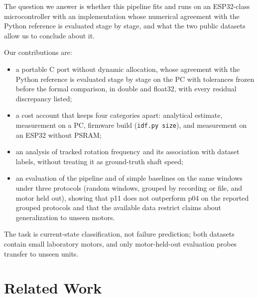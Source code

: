 \documentclass[conference]{IEEEtran}
\newif\ifwip
\begin{document}
The question we answer is whether this pipeline fits and runs on an ESP32-class
microcontroller with an implementation whose numerical agreement with the Python reference is
evaluated stage by stage, and what the two public datasets allow us to conclude about it.
\ifwip
We contribute a portable C implementation whose agreement with the Python reference is evaluated
stage by stage on the PC with tolerances frozen before formal comparison, a cost account that
keeps estimates, PC measurements, firmware builds and on-chip measurements apart, an analysis of
tracked acoustic frequency without treating it as ground-truth shaft speed, and an evaluation
under three protocols showing that p11 does not beat simple baselines and that the available data
restrict claims about generalization to unseen motors.
\else
Our contributions are:
\begin{itemize}
\item a portable C port without dynamic allocation, whose agreement with the Python reference is
evaluated stage by stage on the PC with tolerances frozen before the formal comparison, in double
and float32, with every residual discrepancy listed;
\item a cost account that keeps four categories apart: analytical estimate, measurement on a PC,
firmware build (\texttt{idf.py size}), and measurement on an ESP32 without PSRAM;
\item an analysis of tracked rotation frequency and its association with dataset labels, without
treating it as ground-truth shaft speed;
\item an evaluation of the pipeline and of simple baselines on the same windows under three
protocols (random windows, grouped by recording or file, and motor held out), showing that p11
does not outperform p04 on the reported grouped protocols and that the available data restrict
claims about generalization to unseen motors.
\end{itemize}
\fi
The task is current-state classification, not failure prediction; both datasets contain small
laboratory motors, and only motor-held-out evaluation probes transfer to unseen units.

\section{Related Work}
\end{document}
